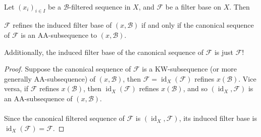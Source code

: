 \documentclass{treatise}
\begin{document}
\ 
\\
\begin{theorem}
Let $(x_i)_{i \in I}$ be a $\mathcal{B}$-filtered sequence in $X$, and $\mathcal{F}$ be a filter base on $X$. Then
\begin{center}
    $\mathcal{F}$ refines the induced filter base of $(x, \mathcal{B})$ if and only if the canonical sequence of $\mathcal{F}$ is an AA-subsequence to $(x, \mathcal{B})$.
\end{center}
Additionally, the induced filter base of the canonical sequence of $\mathcal{F}$ is just $\mathcal{F}$!
\end{theorem}
\begin{proof}
Suppose the canonical sequence of $\mathcal{F}$ is a KW-subsequence (or more generally AA-subsequence) of $(x, \mathcal{B})$, then $\mathcal{F} = \operatorname{id}_X (\mathcal{F})$ refines $x(\mathcal{B})$. Vice versa, if $\mathcal{F}$ refines $x(\mathcal{B})$, then $\operatorname{id}_X (\mathcal{F})$ refines $x(\mathcal{B})$, and so $(\operatorname{id}_X, \mathcal{F})$ is an AA-subsequence of $(x, \mathcal{B})$.
\\
\\
Since the canonical filtered sequence of $\mathcal{F}$ is $(\operatorname{id}_X, \mathcal{F})$, its induced filter base is $\operatorname{id}_X (\mathcal{F}) = \mathcal{F}$.
\end{proof}
\end{document}

